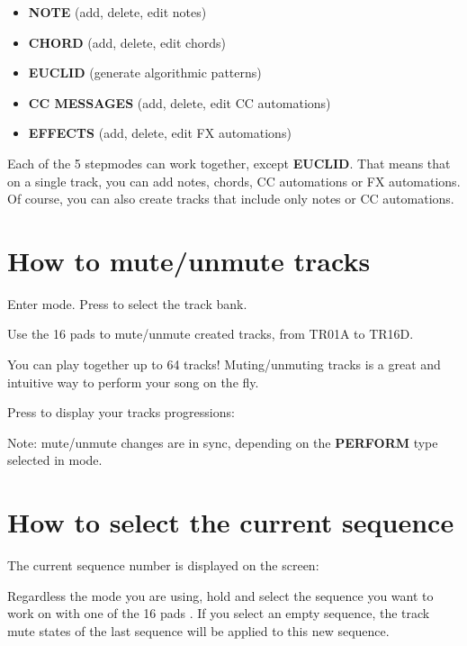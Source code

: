 \begin{itemize}
\item \textbf{NOTE} (add, delete, edit notes)
\item \textbf{CHORD} (add, delete, edit chords)
\item \textbf{EUCLID} (generate algorithmic patterns)
\item \textbf{CC MESSAGES} (add, delete, edit CC automations)
\item \textbf{EFFECTS} (add, delete, edit FX automations)
\end{itemize}

Each of the 5 stepmodes can work together, except \textbf{EUCLID}. That means that on a single track, you can add notes, chords, CC automations or FX automations. Of course, you can also create tracks that include only notes or CC automations.


\section{How to mute/unmute tracks}

Enter  mode. Press \btn{<} \btn{>} to select the track bank.

Use the 16 pads \padsicon{} to mute/unmute created tracks, from TR01A to TR16D.

You can play together up to 64 tracks! Muting/unmuting tracks is a great and intuitive way to perform your song on the fly.

Press  to display your tracks progressions:


Note: mute/unmute changes are in sync, depending on the \textbf{PERFORM} type selected in  mode.


\section{How to select the current sequence}

The current sequence number is displayed on the screen:


Regardless the mode you are using, hold  and select the sequence you want to work on with one of the 16 pads \padsicon{}. If you select an empty sequence, the track mute states of the last sequence will be applied to this new sequence.


